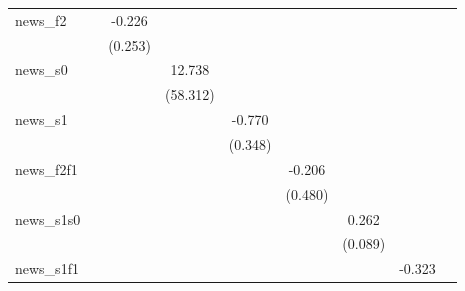 {\begin{tabular}{l*{8}{c}}
\addlinespace
news\_f2     &                     &      -0.226         &                     &                     &                     &                     &                     &                     \\
            &                     &     (0.253)         &                     &                     &                     &                     &                     &                     \\
\addlinespace
news\_s0     &                     &                     &      12.738         &                     &                     &                     &                     &                     \\
            &                     &                     &    (58.312)         &                     &                     &                     &                     &                     \\
\addlinespace
news\_s1     &                     &                     &                     &      -0.770\sym{**} &                     &                     &                     &                     \\
            &                     &                     &                     &     (0.348)         &                     &                     &                     &                     \\
\addlinespace
news\_f2f1   &                     &                     &                     &                     &      -0.206         &                     &                     &                     \\
            &                     &                     &                     &                     &     (0.480)         &                     &                     &                     \\
\addlinespace
news\_s1s0   &                     &                     &                     &                     &                     &       0.262\sym{***}&                     &                     \\
            &                     &                     &                     &                     &                     &     (0.089)         &                     &                     \\
\addlinespace
news\_s1f1   &                     &                     &                     &                     &                     &                     &      -0.323         &                     \\

\end{tabular}}
